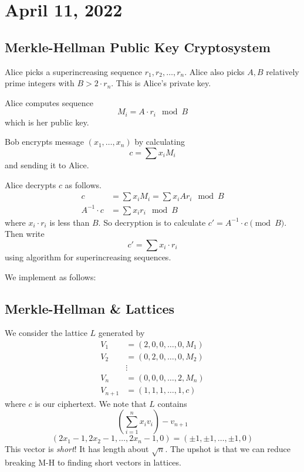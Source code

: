 \section{April 11, 2022}
\subsection{Merkle-Hellman Public Key Cryptosystem}
Alice picks a superincreasing sequence $\boxed{r_1, r_2, \dots, r_n}$. Alice also picks $\boxed{A, B}$ relatively prime integers with $B > 2\cdot r_n$. This is Alice's private key.

Alice computes sequence
\[\boxed{M_i = A\cdot r_i\mod B}\]
which is her public key.

Bob encrypts message $(x_1, \dots, x_n)$ by calculating
\[c = \sum x_i M_i\]
and sending it to Alice.

Alice decrypts $c$ as follows.
\begin{align*}
    c             & = \sum x_i M_i = \sum x_i Ar_i \mod B \\
    A^{-1}\cdot c & = \sum x_i r_i \mod B
\end{align*}
where $x_i\cdot r_i$ is less than $B$. So decryption is to calculate $c' = A^{-1}\cdot c \pmod{B}$. Then write
\[c' = \sum x_i\cdot r_i\]
using algorithm for superincreasing sequences.

We implement as follows:


\subsection{Merkle-Hellman \& Lattices}
We consider the lattice $L$ generated by
\begin{align*}
    V_1     & = (2, 0, 0, \dots, 0, M_1) \\
    V_2     & = (0, 2, 0, \dots, 0, M_2) \\
            & \vdots                     \\
    V_n     & = (0, 0, 0, \dots, 2, M_n) \\
    V_{n+1} & = (1, 1, 1, \dots, 1, c)
\end{align*}
where $c$ is our ciphertext. We note that $L$ contains
\[\left( \sum_{i=1}^n x_iv_i \right)- v_{n+1}\]
\[(2x_1 - 1, 2x_2 - 1, \dots, 2x_n - 1, 0) = (\pm 1, \pm 1, \dots, \pm 1, 0)\]
This vector is \emph{short}! It has length about $\sqrt{n}$. The upshot is that we can reduce breaking M-H to finding short vectors in lattices.

